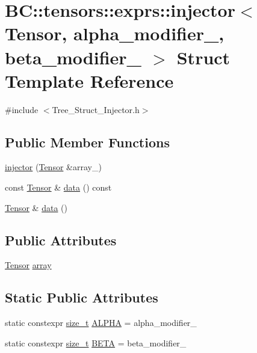 \hypertarget{structBC_1_1tensors_1_1exprs_1_1injector}{}\section{BC\+:\+:tensors\+:\+:exprs\+:\+:injector$<$ Tensor, alpha\+\_\+modifier\+\_\+, beta\+\_\+modifier\+\_\+ $>$ Struct Template Reference}
\label{structBC_1_1tensors_1_1exprs_1_1injector}


{\ttfamily \#include $<$Tree\+\_\+\+Struct\+\_\+\+Injector.\+h$>$}

\subsection*{Public Member Functions}
\begin{DoxyCompactItemize}
\item 
\hyperlink{structBC_1_1tensors_1_1exprs_1_1injector_aae401a69f73f2f0d4a66beb00b6e3908}{injector} (\hyperlink{namespaceBC_1_1tensors_1_1common__using_ae0b2983dde17bb7904dc64aa0cb9a676}{Tensor} \&array\+\_\+)
\item 
const \hyperlink{namespaceBC_1_1tensors_1_1common__using_ae0b2983dde17bb7904dc64aa0cb9a676}{Tensor} \& \hyperlink{structBC_1_1tensors_1_1exprs_1_1injector_a1970254f190e92136b507b5e87c19c59}{data} () const 
\item 
\hyperlink{namespaceBC_1_1tensors_1_1common__using_ae0b2983dde17bb7904dc64aa0cb9a676}{Tensor} \& \hyperlink{structBC_1_1tensors_1_1exprs_1_1injector_a6e3b77b895603cd291687a266e90493c}{data} ()
\end{DoxyCompactItemize}
\subsection*{Public Attributes}
\begin{DoxyCompactItemize}
\item 
\hyperlink{namespaceBC_1_1tensors_1_1common__using_ae0b2983dde17bb7904dc64aa0cb9a676}{Tensor} \hyperlink{structBC_1_1tensors_1_1exprs_1_1injector_a30f1b46e083e1221ea8e80a2ee65d89d}{array}
\end{DoxyCompactItemize}
\subsection*{Static Public Attributes}
\begin{DoxyCompactItemize}
\item 
static constexpr \hyperlink{namespaceBC_a6007cbc4eeec401a037b558910a56173}{size\+\_\+t} \hyperlink{structBC_1_1tensors_1_1exprs_1_1injector_a163e0fc59387bacafcdb1e26b6cdb174}{A\+L\+P\+HA} = alpha\+\_\+modifier\+\_\+
\item 
static constexpr \hyperlink{namespaceBC_a6007cbc4eeec401a037b558910a56173}{size\+\_\+t} \hyperlink{structBC_1_1tensors_1_1exprs_1_1injector_aabb38c0c49d03c65b4925c5f417f88ad}{B\+E\+TA} = beta\+\_\+modifier\+\_\+
\end{DoxyCompactItemize}


